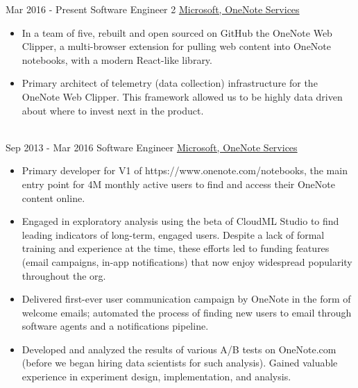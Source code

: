 \documentclass[letterpaper]{twentysecondcv} %
\begin{document}
\begin{twenty} %
\twentyitem
    	{Mar 2016 -}
		{Present}
        {Software Engineer 2}
        {\href{http://www.onenote.com/}{Microsoft, OneNote Services}}
        {}
        {
        {\begin{itemize} \itemsep -2pt %
        \item In a team of five, rebuilt and open sourced on GitHub the OneNote Web Clipper, a multi-browser extension for pulling web content into OneNote notebooks, with a modern React-like library.
        \item Primary architect of telemetry (data collection) infrastructure for the OneNote Web Clipper. This framework allowed us to be highly data driven about where to invest next in the product.
    \end{itemize}}
        }
    \\
	\twentyitem
    	{Sep 2013 -}
		{Mar 2016}
        {Software Engineer}
        {\href{http://www.onenote.com/}{Microsoft, OneNote Services}}
        {}
        {
        {\begin{itemize} \itemsep -2pt %
        \item Primary developer for V1 of https://www.onenote.com/notebooks, the main entry point for 4M monthly active users to find and access their OneNote content online.
        \item Engaged in exploratory analysis using the beta of CloudML Studio to find leading indicators of long-term, engaged users. Despite a lack of formal training and experience at the time, these efforts led to funding features (email campaigns, in-app notifications) that now enjoy widespread popularity throughout the org.
        \item Delivered first-ever user communication campaign by OneNote in the form of welcome emails; automated the process of finding new users to email through software agents and a notifications pipeline.
        \item Developed and analyzed the results of various A/B tests on OneNote.com (before we began hiring data scientists for such analysis). Gained valuable experience in experiment design, implementation, and analysis.
    \end{itemize}}
        }

\end{twenty}
\end{document}

